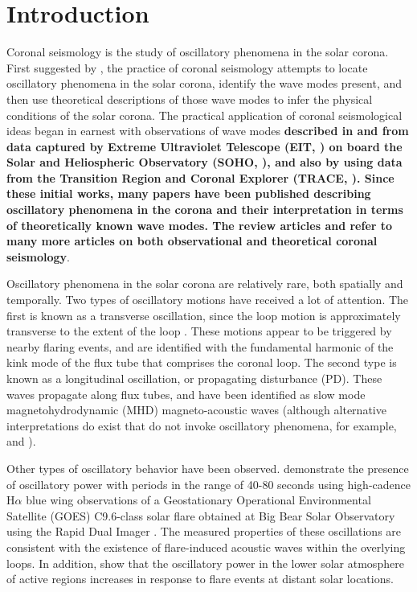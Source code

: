 \documentclass[onecolumn]{emulateapj}
\begin{document}
\section{Introduction}\label{sec:int}
Coronal seismology is the study of oscillatory phenomena in the solar
corona.  First suggested by \cite{1970PASJ...22..341U}, the practice
of coronal seismology attempts to locate oscillatory phenomena in the
solar corona, identify the wave modes present, and then use
theoretical descriptions of those wave modes to infer the physical
conditions of the solar corona.  The practical application of coronal
seismological ideas began in earnest with observations of wave modes
{\bf described in \cite{1998ApJ...501L.217D} and
  \cite{1999SoPh..186..207B} from data captured by Extreme Ultraviolet
  Telescope (EIT, \citealp{1995SoPh..162..291D}) on board the Solar and Heliospheric
  Observatory (SOHO, \citealp{1995SoPh..162....1D}), and also by
  \citep{1999ApJ...520..880A} using data from the Transition Region
  and Coronal Explorer (TRACE, \citealp{1999SoPh..187..229H}).  Since these initial works,
  many papers have been published describing oscillatory phenomena in
  the corona and their interpretation in terms of theoretically known
  wave modes.  The review articles \cite{lrsp-2005-3} and
  \cite{2012RSPTA.370.3193D} refer to many more articles on both
  observational and theoretical coronal seismology}.

Oscillatory phenomena in the solar corona are relatively rare, both
spatially and temporally.  Two types of oscillatory motions have
received a lot of attention.  The first is known as a transverse
oscillation, since the loop motion is approximately transverse to the
extent of the loop \citep{1999Sci...285..862N}.  These motions appear
to be triggered by nearby flaring events, and are identified with the
fundamental harmonic of the kink mode of the flux tube that comprises
the coronal loop.  The second type is known as a longitudinal
oscillation, or propagating disturbance (PD).  These waves propagate
along flux tubes, and have been identified as slow mode
magnetohydrodynamic (MHD) magneto-acoustic waves (although alternative
interpretations do exist that do not invoke oscillatory phenomena, for
example, \citealp*{0004-637X-722-2-1013} and
\citealp*{2041-8205-727-2-L37}).  

Other types of oscillatory behavior have been observed.
\cite{2005ApJ...620.1101M} demonstrate the presence of oscillatory
power with periods in the range of 40-80 seconds using high-cadence
H$\alpha$ blue wing observations of a Geostationary Operational
Environmental Satellite (GOES) C9.6-class solar flare obtained at Big
Bear Solar Observatory using the Rapid Dual Imager
\citep{2000SoPh..193..259P, 2007A&A...473..943J}. The measured
properties of these oscillations are consistent with the existence of
flare-induced acoustic waves within the overlying loops.  In addition,
\cite{2013ApJ...772...54A} show that the oscillatory power in the
lower solar atmosphere of active regions increases in response to
flare events at distant solar locations.
\end{document}

